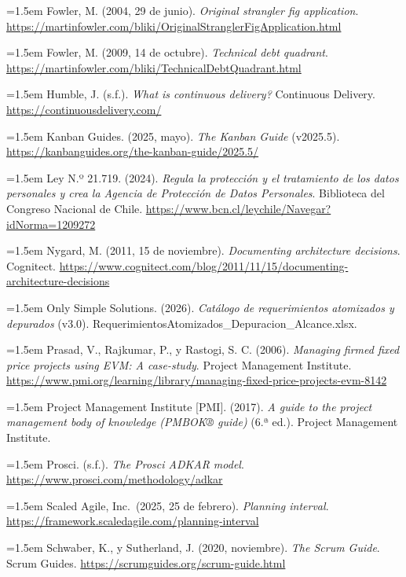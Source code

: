 \documentclass[11pt]{article}
\begin{document}
\noindent\hangindent=1.5em Fowler, M. (2004, 29 de junio). \emph{Original strangler fig application}. \url{https://martinfowler.com/bliki/OriginalStranglerFigApplication.html}

\noindent\hangindent=1.5em Fowler, M. (2009, 14 de octubre). \emph{Technical debt quadrant}. \url{https://martinfowler.com/bliki/TechnicalDebtQuadrant.html}

\noindent\hangindent=1.5em Humble, J. (s.f.). \emph{What is continuous delivery?} Continuous Delivery. \url{https://continuousdelivery.com/}

\noindent\hangindent=1.5em Kanban Guides. (2025, mayo). \emph{The Kanban Guide} (v2025.5). \url{https://kanbanguides.org/the-kanban-guide/2025.5/}

\noindent\hangindent=1.5em Ley N.º 21.719. (2024). \emph{Regula la protección y el tratamiento de los datos personales y crea la Agencia de Protección de Datos Personales}. Biblioteca del Congreso Nacional de Chile. \url{https://www.bcn.cl/leychile/Navegar?idNorma=1209272}

\noindent\hangindent=1.5em Nygard, M. (2011, 15 de noviembre). \emph{Documenting architecture decisions}. Cognitect. \url{https://www.cognitect.com/blog/2011/11/15/documenting-architecture-decisions}

\noindent\hangindent=1.5em Only Simple Solutions. (2026). \emph{Catálogo de requerimientos atomizados y depurados} (v3.0). RequerimientosAtomizados\_Depuracion\_Alcance.xlsx.

\noindent\hangindent=1.5em Prasad, V., Rajkumar, P., y Rastogi, S. C. (2006). \emph{Managing firmed fixed price projects using EVM: A case-study}. Project Management Institute. \url{https://www.pmi.org/learning/library/managing-fixed-price-projects-evm-8142}

\noindent\hangindent=1.5em Project Management Institute {[}PMI{]}. (2017). \emph{A guide to the project management body of knowledge (PMBOK® guide)} (6.ª ed.). Project Management Institute.

\noindent\hangindent=1.5em Prosci. (s.f.). \emph{The Prosci ADKAR model}. \url{https://www.prosci.com/methodology/adkar}

\noindent\hangindent=1.5em Scaled Agile, Inc.~(2025, 25 de febrero). \emph{Planning interval}. \url{https://framework.scaledagile.com/planning-interval}

\noindent\hangindent=1.5em Schwaber, K., y Sutherland, J. (2020, noviembre). \emph{The Scrum Guide}. Scrum Guides. \url{https://scrumguides.org/scrum-guide.html}
\end{document}
